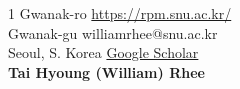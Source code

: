 \documentclass{cv} %
\begin{document}
1 Gwanak-ro \hfill \href{https://rpm.snu.ac.kr/}{https://rpm.snu.ac.kr/}\\
Gwanak-gu \hfill williamrhee@snu.ac.kr\\
Seoul, S. Korea \hfill \href{https://scholar.google.com/citations?user=7yveufgAAAAJ&hl=en}{Google Scholar}\\

\hfil{\namesize\bf Tai Hyoung (William) Rhee}\hfil

%


%


%
%




\vspace{0.5in}
\end{document}
